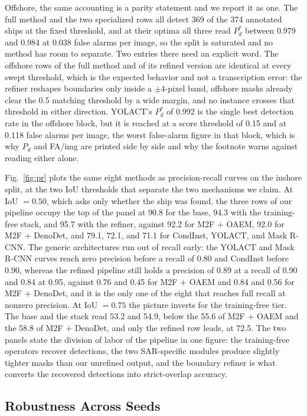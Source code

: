 Offshore, the same accounting is a parity statement and we report it as one. The full method and the two specialized rows all detect 369 of the 374 annotated ships at the fixed threshold, and at their optima all three read $P_d^{*}$ between 0.979 and 0.984 at 0.038 false alarms per image, so the split is saturated and no method has room to separate. Two entries there need an explicit word. The offshore rows of the full method and of its refined version are identical at every swept threshold, which is the expected behavior and not a transcription error: the refiner reshapes boundaries only inside a $\pm4$-pixel band, offshore masks already clear the 0.5 matching threshold by a wide margin, and no instance crosses that threshold in either direction. YOLACT's $P_d^{*}$ of 0.992 is the single best detection rate in the offshore block, but it is reached at a score threshold of 0.15 and at 0.118 false alarms per image, the worst false-alarm figure in that block, which is why $P_d$ and FA/img are printed side by side and why the footnote warns against reading either alone.

Fig.~\ref{fig:pr} plots the same eight methods as precision-recall curves on the inshore split, at the two IoU thresholds that separate the two mechanisms we claim. At IoU $=0.50$, which asks only whether the ship was found, the three rows of our pipeline occupy the top of the panel at 90.8 for the base, 94.3 with the training-free stack, and 95.7 with the refiner, against 92.2 for M2F $+$ OAEM, 92.0 for M2F $+$ DenoDet, and 79.1, 72.1, and 71.1 for CondInst, YOLACT, and Mask R-CNN. The generic architectures run out of recall early: the YOLACT and Mask R-CNN curves reach zero precision before a recall of 0.80 and CondInst before 0.90, whereas the refined pipeline still holds a precision of 0.89 at a recall of 0.90 and 0.84 at 0.95, against 0.76 and 0.45 for M2F $+$ OAEM and 0.84 and 0.56 for M2F $+$ DenoDet, and it is the only one of the eight that reaches full recall at nonzero precision. At IoU $=0.75$ the picture inverts for the training-free tier. The base and the stack read 53.2 and 54.9, below the 55.6 of M2F $+$ OAEM and the 58.8 of M2F $+$ DenoDet, and only the refined row leads, at 72.5. The two panels state the division of labor of the pipeline in one figure: the training-free operators recover detections, the two SAR-specific modules produce slightly tighter masks than our unrefined output, and the boundary refiner is what converts the recovered detections into strict-overlap accuracy.

\subsection{Robustness Across Seeds}\label{sec:exp:robust}

